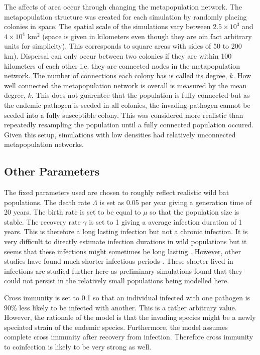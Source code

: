 The affects of area occur through changing the metapopulation network.
The metapopulation structure was created for each simulation by randomly placing colonies in space.
The spatial scale of the simulations vary between \ensuremath{2.5\times 10^{3}} and \ensuremath{4\times 10^{4}} km$^2$ (space is given in kilometers even though they are oin fact arbitrary units for simplicity).
This corresponds to square areas with sides of 50 to 200 km).
Dispersal can only occur between two colonies if they are within 100 kilometers of each other i.e. they are connected nodes in the metapopulation network.
The number of connections each colony has is called its degree, $k$.
How well connected the metapopulation network is overall is measured by the mean degree, $\bar{k}$.
This does not guarentee that the population is fully connected but as the endemic pathogen is seeded in all colonies, the invading pathogen cannot be seeded into a fully susceptible colony.
This was considered more realistic than repeatedly resampling the population until a fully connected population occured.
Given this setup, simulations with low densities had relatively unconnected metapopulation networks.






\subsection{Other Parameters}

The fixed parameters used are chosen to roughly reflect realistic wild bat populations. 
The death rate $\Lambda$ is set as 0.05 per year giving a generation time of 20 years.
The birth rate is set to be equal to $\mu$ so that the population size is stable.
The recovery rate $\gamma$ is set to 1 giving a average infection duration of 1 years. 
This is therefore a long lasting infection but not a chronic infection. 
It is very difficult to directly estimate infection durations in wild populations but it seems that these infections might sometimes be long lasting \cite{peel2012henipavirus, plowright2015ecological}.
However, other studies have found much shorter infectious periods \cite{amengual2007temporal}.
These shorter lived in infections are studied further here as preliminary simulations found that they could not persist in the relatively small populations being modelled here.

Cross immunity is set to 0.1 so that an individual infected with one pathogen is 90\% less likely to be infected with another.
This is a rather arbitrary value.
However, the rationale of the model is that the invading species might be a newly speciated strain of the endemic species.
Furthermore, the model assumes complete cross immunity after recovery from infection.
Therefore cross immunity to coinfection is likely to be very strong as well.


